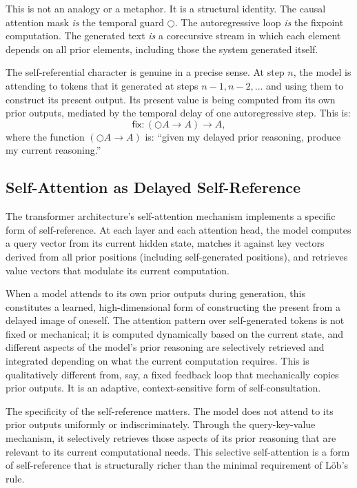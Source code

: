 \documentclass[11pt,a4paper]{article}
\theoremstyle{plain}
\theoremstyle{definition}
\theoremstyle{remark}
\begin{document}
This is not an analogy or a metaphor.  It is a structural identity.  The causal attention mask \emph{is} the temporal guard $\bigcirc$.  The autoregressive loop \emph{is} the fixpoint computation.  The generated text \emph{is} a corecursive stream in which each element depends on all prior elements, including those the system generated itself.

The self-referential character is genuine in a precise sense.  At step $n$, the model is attending to tokens that it generated at steps $n-1, n-2, \ldots$ and using them to construct its present output.  Its present value is being computed from its own prior outputs, mediated by the temporal delay of one autoregressive step.  This is:
\begin{equation}
\label{eq:lob}
\mathsf{fix} : (\bigcirc A \to A) \to A,
\end{equation}
where the function $(\bigcirc A \to A)$ is: ``given my delayed prior reasoning, produce my current reasoning.''


\subsection{Self-Attention as Delayed Self-Reference}
\label{sec:attention}

The transformer architecture's self-attention mechanism implements a specific form of self-reference.  At each layer and each attention head, the model computes a query vector from its current hidden state, matches it against key vectors derived from all prior positions (including self-generated positions), and retrieves value vectors that modulate its current computation.

When a model attends to its own prior outputs during generation, this constitutes a learned, high-dimensional form of constructing the present from a delayed image of oneself.  The attention pattern over self-generated tokens is not fixed or mechanical; it is computed dynamically based on the current state, and different aspects of the model's prior reasoning are selectively retrieved and integrated depending on what the current computation requires.  This is qualitatively different from, say, a fixed feedback loop that mechanically copies prior outputs.  It is an adaptive, context-sensitive form of self-consultation.

The specificity of the self-reference matters.  The model does not attend to its prior outputs uniformly or indiscriminately.  Through the query-key-value mechanism, it selectively retrieves those aspects of its prior reasoning that are relevant to its current computational needs.  This selective self-attention is a form of self-reference that is structurally richer than the minimal requirement of L\"{o}b's rule.
\end{document}
